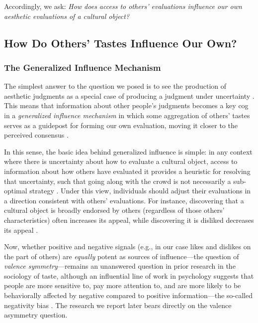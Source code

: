 \documentclass[12pt, letterpaper]{article}
\begin{document}
Accordingly, we ask: \textit{How does access to others' evaluations influence our own aesthetic evaluations of a cultural object?}


\subsection{How Do Others' Tastes Influence Our Own?}

\subsubsection{The Generalized Influence Mechanism}

The simplest answer to the question we posed is to see the production of aesthetic judgments as a special case of producing a judgment under uncertainty \citep{kahneman2011thinking-137}. This means that information about other people's judgments becomes a key cog in a \textit{generalized influence mechanism} in which some aggregation of others' tastes serves as a guidepost for forming our own evaluation, moving it closer to the perceived consensus \citep{salganik2006experimental-88d, childress2012cultural-0cc}. 

In this sense, the basic idea behind generalized influence is simple: in any context where there is uncertainty about how to evaluate a cultural object, access to information about how others have evaluated it provides a heuristic for resolving that uncertainty, such that going along with the crowd is not necessarily a sub-optimal strategy \citep{strang2001search-10a, mark2003culture-ed5}. Under this view, individuals should adjust their evaluations in a direction consistent with others' evaluations. For instance, discovering that a cultural object is broadly endorsed by others (regardless of those others' characteristics) often increases its appeal, while discovering it is disliked decreases its appeal \citep{salganik2006experimental-88d}. 

Now, whether positive and negative signals (e.g., in our case likes and dislikes on the part of others) are \textit{equally} potent as sources of influence---the question of \textit{valence symmetry}---remains an unanswered question in prior research in the sociology of taste, although an influential line of work in psychology suggests that people are more sensitive to,  pay more attention to, and are more likely to be behaviorally affected by negative compared to positive information---the so-called negativity bias \citep{rozin2001negativity-01e, baumeister2001bad-19b}. The research we report later bears directly on the valence asymmetry question.
\end{document}
